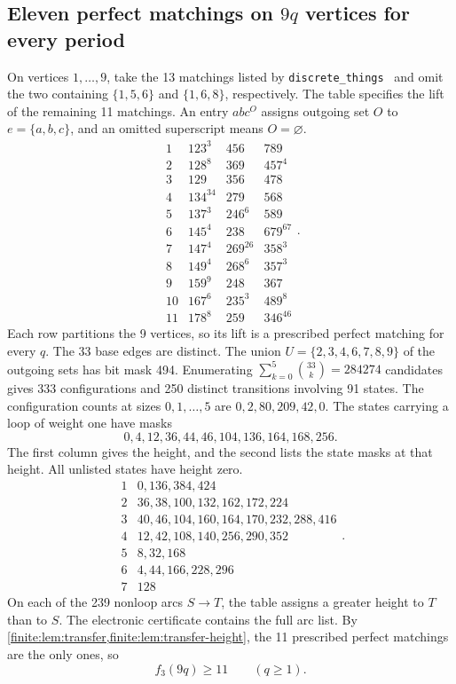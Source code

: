 \documentclass[10pt]{article}
\numberwithin{equation}{section}
\begin{document}
\subsection{Eleven perfect matchings on \texorpdfstring{$9q$}{9q} vertices for every period}\label{finite:subsec:eleven-period}
On vertices $1,\ldots,9$, take the 13 matchings listed by \texttt{discrete\_things}~\cite{DiscreteThings2024} and omit the two containing $\{1,5,6\}$ and $\{1,6,8\}$, respectively. The table specifies the lift of the remaining 11 matchings. An entry $abc^O$ assigns outgoing set $O$ to $e=\{a,b,c\}$, and an omitted superscript means $O=\varnothing$.
\[
\begin{array}{c|ccc}
1&123^{3}&456&789\\
2&128^{8}&369&457^{4}\\
3&129&356&478\\
4&134^{34}&279&568\\
5&137^{3}&246^{6}&589\\
6&145^{4}&238&679^{67}\\
7&147^{4}&269^{26}&358^{3}\\
8&149^{4}&268^{6}&357^{3}\\
9&159^{9}&248&367\\
10&167^{6}&235^{3}&489^{8}\\
11&178^{8}&259&346^{46}
\end{array}.
\]
Each row partitions the 9 vertices, so its lift is a prescribed perfect matching for every $q$. The 33 base edges are distinct. The union $U=\{2,3,4,6,7,8,9\}$ of the outgoing sets has bit mask 494. Enumerating $\sum_{k=0}^{5}\binom{33}{k}=284274$ candidates gives 333 configurations and 250 distinct transitions involving 91 states. The configuration counts at sizes $0,1,\ldots,5$ are $0,2,80,209,42,0$. The states carrying a loop of weight one have masks
\[
 0,4,12,36,44,46,104,136,164,168,256.
\]
The first column gives the height, and the second lists the state masks at that height. All unlisted states have height zero.
\[
\begin{array}{c|l}
1&0,136,384,424\\
2&36,38,100,132,162,172,224\\
3&40,46,104,160,164,170,232,288,416\\
4&12,42,108,140,256,290,352\\
5&8,32,168\\
6&4,44,166,228,296\\
7&128
\end{array}.
\]
On each of the 239 nonloop arcs $S\to T$, the table assigns a greater height to $T$ than to $S$. The electronic certificate contains the full arc list. By \cref{finite:lem:transfer,finite:lem:transfer-height}, the 11 prescribed perfect matchings are the only ones, so
\begin{equation}\label{finite:eq:eleven-period}
 f_3(9q)\ge11\qquad(q\ge1).
\end{equation}
\end{document}
